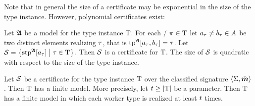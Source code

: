 Note that in general the size of a certificate may be exponential in
the size of the type instance. However, polynomial certificates exist:
\begin{lemma}\label{lem:cert-extract}
Let $\mathfrak{A}$ be a model for the type instance $\mathrm{T}$.
For each \twotype/ $\pi\in\mathrm{T}$ let $a_{\tau} \neq b_{\tau} \in A$
be two distinct elements realizing $\tau$, that is
$\operatorname{tp}^{\mathfrak{A}}[a_{\tau},b_{\tau}] = \tau$.
Let $\mathcal{S} = \left\{\operatorname{stp}^{\mathfrak{A}}[a_{\tau}]\mathrel{}\middle|\mathrel{}\tau \in \mathrm{T}\right\}$.
Then $\mathcal{S}$ is a certificate for $\mathrm{T}$.
The size of $\mathcal{S}$ is quadratic with respect to the size of the type instance.
\end{lemma}

\begin{lemma}\label{lem:cert-expand}
Let $\mathcal{S}$ be a certificate for the type instance $\mathrm{T}$ over the classified
signature $\left\langle \mathrm{\Sigma},\bar{\bm{m}} \right\rangle$.
Then $\mathrm{T}$ has a finite model.
More precisely, let $t \geq \left|\mathrm{T}\right|$ be a parameter.
Then $\mathrm{T}$ has a finite model in which each worker type is realized at least
$t$ times.
\end{lemma}
